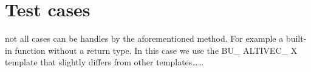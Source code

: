 \chapter{Test cases}
\label{chapter:tests}

not all cases can be handles by the aforementioned method. For example a built-in function without a return type. In  this case we use the BU\_ ALTIVEC\_ X template that slightly differs from other templates……

